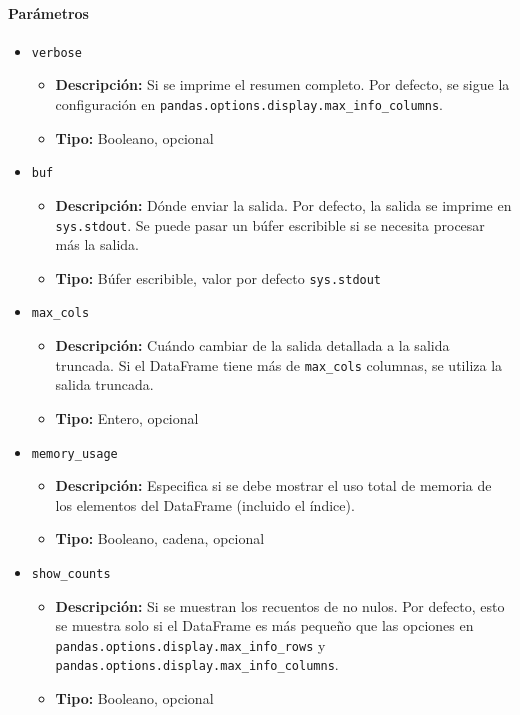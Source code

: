         \paragraph{\textbf{Parámetros}}
        \begin{itemize}
            \item \texttt{verbose}
                \begin{itemize}
                    \item \textbf{Descripción:} Si se imprime el resumen completo. Por defecto, se sigue la configuración en \texttt{pandas.options.display.max\_info\_columns}.
                    \item \textbf{Tipo:} Booleano, opcional
                \end{itemize}
            \item \texttt{buf}
                \begin{itemize}
                    \item \textbf{Descripción:} Dónde enviar la salida. Por defecto, la salida se imprime en \texttt{sys.stdout}. Se puede pasar un búfer escribible si se necesita procesar más la salida.
                    \item \textbf{Tipo:} Búfer escribible, valor por defecto \texttt{sys.stdout}
                \end{itemize}
            \item \texttt{max\_cols}
                \begin{itemize}
                    \item \textbf{Descripción:} Cuándo cambiar de la salida detallada a la salida truncada. Si el DataFrame tiene más de \texttt{max\_cols} columnas, se utiliza la salida truncada.
                    \item \textbf{Tipo:} Entero, opcional
                \end{itemize}
            \item \texttt{memory\_usage}
                \begin{itemize}
                    \item \textbf{Descripción:} Especifica si se debe mostrar el uso total de memoria de los elementos del DataFrame (incluido el índice).
                    \item \textbf{Tipo:} Booleano, cadena, opcional
                \end{itemize}
            \item \texttt{show\_counts}
                \begin{itemize}
                    \item \textbf{Descripción:} Si se muestran los recuentos de no nulos. Por defecto, esto se muestra solo si el DataFrame es más pequeño que las opciones en \texttt{pandas.options.display.max\_info\_rows} y \texttt{pandas.options.display.max\_info\_columns}.
                    \item \textbf{Tipo:} Booleano, opcional
                \end{itemize}
        \end{itemize}

